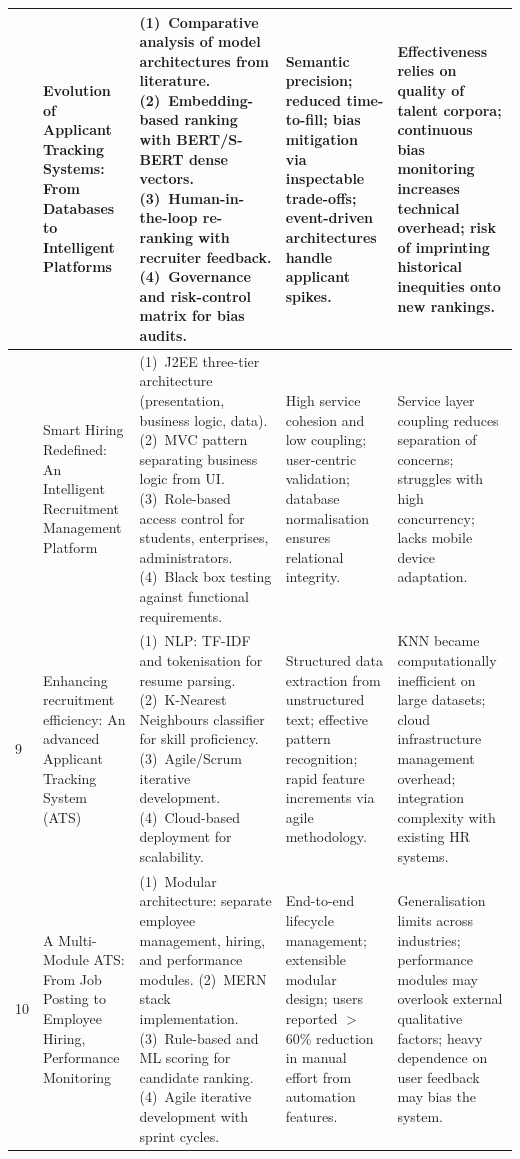 \documentclass[12pt,a4paper]{report}
\begin{document}
\begin{longtable}{|>{\centering\arraybackslash}p{0.6cm}|p{3.1cm}|p{3.6cm}|p{3.2cm}|p{3.2cm}|}
7 &
Evolution of Applicant Tracking Systems: From Databases to Intelligent Platforms \cite{ref7} &
(1)~Comparative analysis of model architectures from literature. (2)~Embedding-based ranking with BERT/S-BERT dense vectors. (3)~Human-in-the-loop re-ranking with recruiter feedback. (4)~Governance and risk-control matrix for bias audits. &
Semantic precision; reduced time-to-fill; bias mitigation via inspectable trade-offs; event-driven architectures handle applicant spikes. &
Effectiveness relies on quality of talent corpora; continuous bias monitoring increases technical overhead; risk of imprinting historical inequities onto new rankings. \\
\hline

8 &
Smart Hiring Redefined: An Intelligent Recruitment Management Platform \cite{ref8} &
(1)~J2EE three-tier architecture (presentation, business logic, data). (2)~MVC pattern separating business logic from UI. (3)~Role-based access control for students, enterprises, administrators. (4)~Black box testing against functional requirements. &
High service cohesion and low coupling; user-centric validation; database normalisation ensures relational integrity. &
Service layer coupling reduces separation of concerns; struggles with high concurrency; lacks mobile device adaptation. \\
\hline

9 &
Enhancing recruitment efficiency: An advanced Applicant Tracking System (ATS) \cite{ref9} &
(1)~NLP: TF-IDF and tokenisation for resume parsing. (2)~K-Nearest Neighbours classifier for skill proficiency. (3)~Agile/Scrum iterative development. (4)~Cloud-based deployment for scalability. &
Structured data extraction from unstructured text; effective pattern recognition; rapid feature increments via agile methodology. &
KNN became computationally inefficient on large datasets; cloud infrastructure management overhead; integration complexity with existing HR systems. \\
\hline

10 &
A Multi-Module ATS: From Job Posting to Employee Hiring, Performance Monitoring \cite{ref10} &
(1)~Modular architecture: separate employee management, hiring, and performance modules. (2)~MERN stack implementation. (3)~Rule-based and ML scoring for candidate ranking. (4)~Agile iterative development with sprint cycles. &
End-to-end lifecycle management; extensible modular design; users reported $>$60\% reduction in manual effort from automation features. &
Generalisation limits across industries; performance modules may overlook external qualitative factors; heavy dependence on user feedback may bias the system. \\
\hline


\end{longtable}
\end{document}

